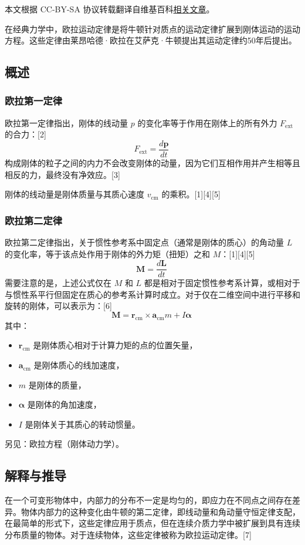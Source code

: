 
本文根据 CC-BY-SA 协议转载翻译自维基百科\href{https://en.wikipedia.org/wiki/Euler\%27s_laws_of_motion}{相关文章}。

在经典力学中，欧拉运动定律是将牛顿针对质点的运动定律扩展到刚体运动的运动方程。这些定律由莱昂哈德·欧拉在艾萨克·牛顿提出其运动定律约50年后提出。

\subsection{概述}  
\subsubsection{欧拉第一定律}  
欧拉第一定律指出，刚体的线动量 \( p \) 的变化率等于作用在刚体上的所有外力 \( F_{\text{ext}} \) 的合力：[2]  
\[
F_{\text{ext}} = \frac{d\mathbf{p}}{dt}~
\]  
构成刚体的粒子之间的内力不会改变刚体的动量，因为它们互相作用并产生相等且相反的力，最终没有净效应。[3]  

刚体的线动量是刚体质量与其质心速度 \( v_{\text{cm}} \) 的乘积。[1][4][5]
\subsubsection{欧拉第二定律}  
欧拉第二定律指出，关于惯性参考系中固定点（通常是刚体的质心）的角动量 \( L \) 的变化率，等于该点处作用于刚体的外力矩（扭矩）之和 \( M \)：[1][4][5]  
\[
\mathbf{M} = \frac{d\mathbf{L}}{dt}~
\]  
需要注意的是，上述公式仅在 \( M \) 和 \( L \) 都是相对于固定惯性参考系计算，或相对于与惯性系平行但固定在质心的参考系计算时成立。对于仅在二维空间中进行平移和旋转的刚体，可以表示为：[6]  
\[
\mathbf{M} = \mathbf{r}_{\text{cm}} \times \mathbf{a}_{\text{cm}} m + I \boldsymbol{\alpha}~
\]  
其中：  
\begin{itemize}
\item \( \mathbf{r}_{\text{cm}} \) 是刚体质心相对于计算力矩的点的位置矢量，  
\item \( \mathbf{a}_{\text{cm}} \) 是刚体质心的线加速度，  
\item \( m \) 是刚体的质量，  
\item \( \boldsymbol{\alpha} \) 是刚体的角加速度，  
\item \( I \) 是刚体关于其质心的转动惯量。  
\end{itemize}
另见：欧拉方程（刚体动力学）。
\subsection{解释与推导} 
在一个可变形物体中，内部力的分布不一定是均匀的，即应力在不同点之间存在差异。物体内部力的这种变化由牛顿的第二定律，即线动量和角动量守恒定律支配，在最简单的形式下，这些定律应用于质点，但在连续介质力学中被扩展到具有连续分布质量的物体。对于连续物体，这些定律被称为欧拉运动定律。[7]

